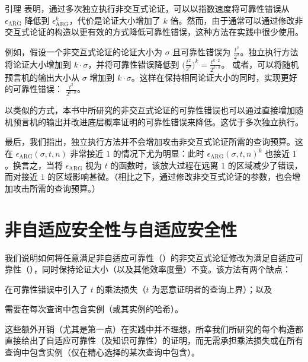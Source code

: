\documentclass[american,singlepageview]{snargs-book-zh}
\newcommand{\InstanceSize}{n}
\newcommand{\ProtoSoundnessError}{\epsilon}
\newcommand{\ARGSubscript}{\scriptscriptstyle\mathrm{ARG}}
\newcommand{\ARGNASoundnessError}{\ProtoSoundnessError_{\ARGSubscript}}
\newcommand{\ARGRepetitionParameter}{k}
\newcommand{\ROQueryBound}{t}
\newcommand{\ROOutputSize}{\sigma}
\begin{document}
\begin{remark}[实践中的错误降低]
引理 表明，通过多次独立执行非交互式论证，可以以指数速度将可靠性错误从 $\ARGNASoundnessError$ 降低到 $\ARGNASoundnessError^{\ARGRepetitionParameter}$，代价是论证大小增加了 $\ARGRepetitionParameter$ 倍。然而，由于通常可以通过修改非交互式论证的构造以更有效的方式降低可靠性错误，这种方法在实践中很少使用。

例如，假设一个非交互式论证的论证大小为 $\ROOutputSize$ 且可靠性错误为 $\frac{\ROQueryBound^2}{2^{\ROOutputSize}}$。独立执行方法将论证大小增加到 $\ARGRepetitionParameter \cdot \ROOutputSize$，并将可靠性错误降低到
$\bigl(\tfrac{\ROQueryBound^2}{2^{\ROOutputSize}}\bigr)^{\ARGRepetitionParameter}
=
\tfrac{\ROQueryBound^{\ARGRepetitionParameter\cdot 2}}{2^{\ARGRepetitionParameter\cdot \ROOutputSize}}$。
或者，可以将随机预言机的输出大小从 $\ROOutputSize$ 增加到 $\ARGRepetitionParameter \cdot \ROOutputSize$。这样在保持相同论证大小的同时，实现更好的可靠性错误：
$\tfrac{\ROQueryBound^2}{2^{\ARGRepetitionParameter\cdot \ROOutputSize}}$。

以类似的方式，本书中所研究的非交互式论证的可靠性错误也可以通过直接增加随机预言机的输出并改进底层概率证明的可靠性错误来降低。这优于多次独立执行。

最后，我们指出，独立执行方法并不会增加攻击非交互式论证所需的查询预算。这在 $\ARGNASoundnessError(\ROOutputSize,\ROQueryBound,\InstanceSize)$ 非常接近 $1$ 的情况下尤为明显：此时 $\ARGNASoundnessError(\ROOutputSize,\ROQueryBound,\InstanceSize)^{\ARGRepetitionParameter}$ 也接近 $1$。换言之，当将 $\ARGNASoundnessError$ 视为 $\ROQueryBound$ 的函数时，该放大过程在远离 $1$ 的区域减少了错误，而对接近 $1$ 的区域影响甚微。（相比之下，通过修改非交互式论证的参数，也会增加攻击所需的查询预算。）
\end{remark}

\section{非自适应安全性与自适应安全性}
\label{section:non-adaptive-security}

我们说明如何将任意满足非自适应可靠性（）的非交互式论证修改为满足自适应可靠性（），同时保持论证大小（以及其他效率度量）不变。该方法有两个缺点：
\begin{inparaenum}[(a)]
  \item 在可靠性错误中引入了 $\ROQueryBound$ 的乘法损失（$\ROQueryBound$ 为恶意证明者的查询上界）；以及
  \item 需要在每次查询中包含实例（或其实例的哈希）。
\end{inparaenum}
这些额外开销（尤其是第一点）在实践中并不理想，所幸我们所研究的每个构造都直接给出了自适应可靠性（及知识可靠性）的证明，而无需承担乘法损失或在所有查询中包含实例（仅在精心选择的某次查询中包含）。
\end{document}
